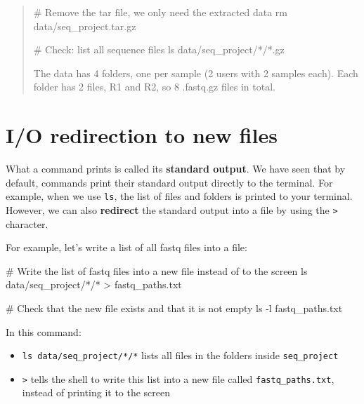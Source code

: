\documentclass[
  letterpaper,
  DIV=11,
  numbers=noendperiod]{scrreprt}
\newenvironment{Shaded}{}{}
\newcommand{\AttributeTok}[1]{\textcolor[rgb]{0.84,0.23,0.29}{#1}}
\newcommand{\CommentTok}[1]{\textcolor[rgb]{0.42,0.45,0.49}{#1}}
\newcommand{\FunctionTok}[1]{\textcolor[rgb]{0.44,0.26,0.76}{#1}}
\newcommand{\InformationTok}[1]{\textcolor[rgb]{0.42,0.45,0.49}{#1}}
\newcommand{\NormalTok}[1]{\textcolor[rgb]{0.14,0.16,0.18}{#1}}
\newcommand{\OperatorTok}[1]{\textcolor[rgb]{0.14,0.16,0.18}{#1}}
\newcommand{\PreprocessorTok}[1]{\textcolor[rgb]{0.84,0.23,0.29}{#1}}
\providecommand{\tightlist}{%
  \setlength{\itemsep}{0pt}\setlength{\parskip}{0pt}}
\begin{document}
\begin{tcolorbox}
\begin{quote}
\begin{Shaded}
\begin{Highlighting}[]
\CommentTok{\# Remove the tar file, we only need the extracted data}
\FunctionTok{rm}\NormalTok{ data/seq\_project.tar.gz}

\CommentTok{\# Check: list all sequence files}
\FunctionTok{ls}\NormalTok{ data/seq\_project/}\PreprocessorTok{*}\NormalTok{/}\PreprocessorTok{*}\NormalTok{.gz}
\InformationTok{\textasciigrave{}\textasciigrave{}\textasciigrave{}}

\NormalTok{The data has 4 folders, one per sample (2 users with 2 samples each).}
\NormalTok{Each folder has 2 files, R1 and R2, so 8 }\InformationTok{\textasciigrave{}.fastq.gz\textasciigrave{}}\NormalTok{ files in total.}
\end{Highlighting}
\end{Shaded}
\end{quote}

\end{tcolorbox}

\section{I/O redirection to new
files}\label{io-redirection-to-new-files}

What a command prints is called its \textbf{standard output}. We have
seen that by default, commands print their standard output directly to
the terminal. For example, when we use \texttt{ls}, the list of files
and folders is printed to your terminal. However, we can also
\textbf{redirect} the standard output into a file by using the
\texttt{\textgreater{}} character.

For example, let's write a list of all fastq files into a file:

\begin{Shaded}
\begin{Highlighting}[]
\CommentTok{\# Write the list of fastq files into a new file instead of to the screen}
\FunctionTok{ls}\NormalTok{ data/seq\_project/}\PreprocessorTok{*}\NormalTok{/}\PreprocessorTok{*} \OperatorTok{\textgreater{}}\NormalTok{ fastq\_paths.txt}

\CommentTok{\# Check that the new file exists and that it is not empty}
\FunctionTok{ls} \AttributeTok{{-}l}\NormalTok{ fastq\_paths.txt}
\end{Highlighting}
\end{Shaded}

In this command:

\begin{itemize}
\tightlist
\item
  \texttt{ls\ data/seq\_project/*/*} lists all files in the folders
  inside \texttt{seq\_project}
\item
  \texttt{\textgreater{}} tells the shell to write this list into a new
  file called \texttt{fastq\_paths.txt}, instead of printing it to the
  screen
\end{itemize}
\end{document}
